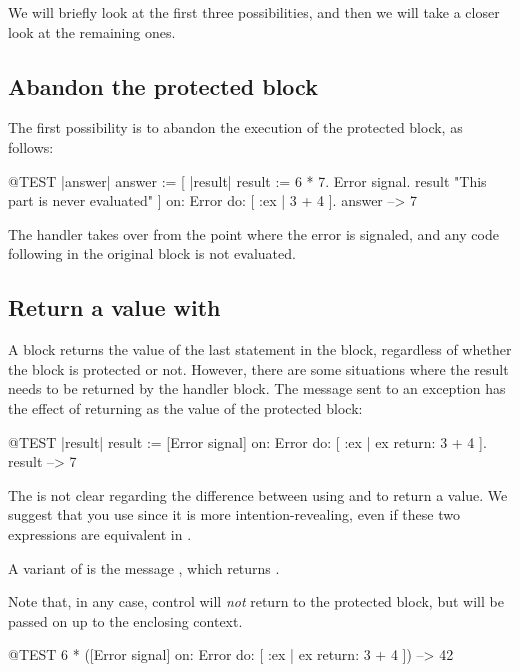 \documentclass[a4paper,10pt,twoside]{book}
\begin{document}
We will briefly look at the first three possibilities, and then we will take a closer look at the remaining ones.

\subsection{Abandon the protected block}

The first possibility is to abandon the execution of the protected block, as follows:
\begin{code}{@TEST |answer|}
answer := [ |result|
	result := 6 * 7.
	Error signal.
	result 	"This part is never evaluated" ]	
	   on: Error
	   do: [ :ex | 3 + 4 ].
answer --> 7
\end{code}

The handler takes over from the point where the error is signaled, and any code following in the original block is not evaluated.

\subsection{Return a value with }
A block returns the value of the last statement in the block, regardless of whether the block is protected or not. However, there are some situations where the result needs to be returned by the handler block. The message  sent to an exception has the effect of returning  as the value of the protected block:

\begin{code}{@TEST |result|}
result := [Error signal]
	on: Error
	do: [ :ex | ex return: 3 + 4 ].
result --> 7
\end{code}

The  is not clear regarding the difference between using  and  to return a value. We suggest that you use  since it is more intention-revealing, even if these two expressions are equivalent in \pharo.

A variant of  is the message , which returns . 

Note that, in any case, control will \emph{not} return to the protected block, but will be passed on up to the enclosing context.

\begin{code}{@TEST}
6 * ([Error signal] on: Error do: [ :ex | ex return: 3 + 4 ]) --> 42
\end{code}
\end{document}

